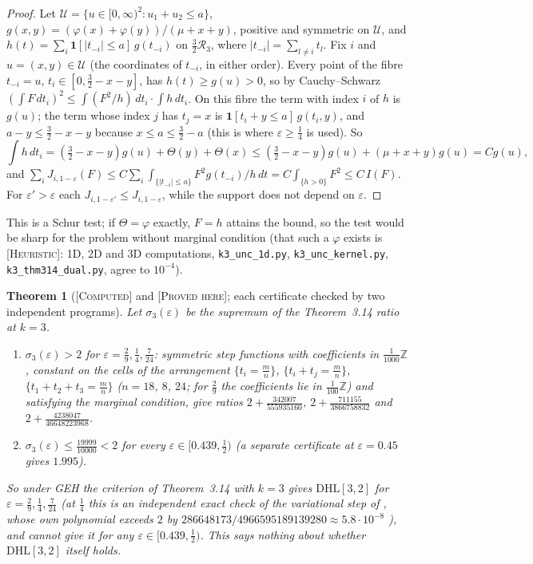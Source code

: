 \documentclass[11pt]{amsart}
\newtheorem{theorem}{Theorem}[section]
\theoremstyle{definition}
\theoremstyle{remark}
\newcommand{\lbl}[1]{\textup{\textsc{[#1]}}}
\begin{document}
\begin{proof}
Let $\mathcal U=\{u\in[0,\infty)^2:u_1+u_2\le a\}$,
$g(x,y)=(\varphi(x)+\varphi(y))/(\mu+x+y)$, positive and symmetric on
$\mathcal U$, and $h(t)=\sum_i\mathbf 1[|t_{-i}|\le a]\,g(t_{-i})$ on
$\frac32\mathcal R_3$, where $|t_{-i}|=\sum_{l\ne i}t_l$. Fix $i$ and
$u=(x,y)\in\mathcal U$ (the coordinates of $t_{-i}$, in either order). Every point
of the fibre $t_{-i}=u$, $t_i\in[0,\frac32-x-y]$, has $h(t)\ge g(u)>0$, so by
Cauchy--Schwarz $\left(\int F\,dt_i\right)^2\le\int(F^2/h)\,dt_i\cdot\int h\,dt_i$.
On this fibre the term with index $i$ of $h$ is $g(u)$; the term whose index
$j$ has $t_j=x$ is $\mathbf 1[t_i+y\le a]\,g(t_i,y)$, and $a-y\le\frac32-x-y$
because $x\le a\le\frac32-a$ (this is where $\varepsilon\ge\frac14$ is used). So
\[
\int h\,dt_i=\left(\tfrac32-x-y\right)g(u)+\Theta(y)+\Theta(x)\le\left(\tfrac32-x-y\right)g(u)+(\mu+x+y)g(u)=Cg(u),
\]
and $\sum_iJ_{i,1-\varepsilon}(F)\le C\sum_i\int_{\{|t_{-i}|\le a\}}F^2g(t_{-i})/h\,dt
=C\int_{\{h>0\}}F^2\le C\,I(F)$. For $\varepsilon'>\varepsilon$ each
$J_{i,1-\varepsilon'}\le J_{i,1-\varepsilon}$, while the support does not depend on
$\varepsilon$.
\end{proof}

This is a Schur test; if $\Theta=\varphi$ exactly, $F=h$ attains the bound, so
the test would be sharp for the problem without marginal condition (that such
a $\varphi$ exists is \lbl{Heuristic}: 1D, 2D and 3D computations, \texttt{k3\_unc\_1d.py},
\texttt{k3\_unc\_kernel.py}, \texttt{k3\_thm314\_dual.py}, agree to $10^{-4}$).

\begin{theorem}[\lbl{Computed} and \lbl{Proved here}; each certificate checked by two independent programs]\label{thm:k3-window}
Let $\sigma_3(\varepsilon)$ be the supremum of the Theorem~3.14 ratio at $k=3$.
\begin{enumerate}
\item $\sigma_3(\varepsilon)>2$ for $\varepsilon=\frac29,\frac14,\frac7{24}$: symmetric step
  functions with coefficients in $\frac1{1000}\mathbb Z$, constant on the cells of
  the arrangement $\{t_i=\frac mn\}$, $\{t_i+t_j=\frac mn\}$,
  $\{t_1+t_2+t_3=\frac mn\}$ ($n=18$, $8$, $24$; for $\frac29$ the coefficients lie in
  $\frac1{100}\mathbb Z$) and satisfying the marginal
  condition, give ratios $2+\frac{342007}{555935160}$,
  $2+\frac{711155}{3866758832}$ and $2+\frac{4238047}{46648223968}$.
\item $\sigma_3(\varepsilon)\le\frac{19999}{10000}<2$ for every $\varepsilon\in[0.439,\frac12)$
  (a separate certificate at $\varepsilon=0.45$ gives $1.995$).
\end{enumerate}
So under GEH the criterion of Theorem~3.14 with $k=3$ gives $\mathrm{DHL}[3,2]$
for $\varepsilon=\frac29,\frac14,\frac7{24}$ (at $\frac14$ this is an independent exact
check of the variational step of \cite[Theorem~3.15]{PM8b}, whose own
polynomial exceeds $2$ by $286648173/4966595189139280\approx5.8\cdot10^{-8}$
\cite[Theorem~3.15]{PM8b}), and cannot give it for any
$\varepsilon\in[0.439,\frac12)$. This says nothing about whether $\mathrm{DHL}[3,2]$
itself holds.
\end{theorem}
\end{document}
